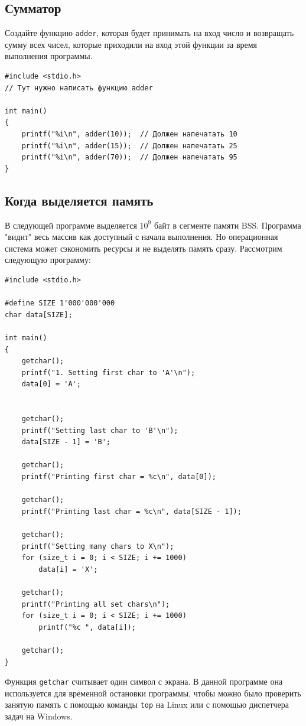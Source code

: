 \documentclass[10pt]{article}
\begin{document}
\subsection{Сумматор}
Создайте функцию \texttt{adder}, которая будет принимать на вход число и возвращать сумму всех чисел, которые приходили на вход этой функции за время выполнения программы.
\begin{lstlisting}
#include <stdio.h>
// Тут нужно написать функцию adder

int main()
{
    printf("%i\n", adder(10));  // Должен напечатать 10
    printf("%i\n", adder(15));  // Должен напечатать 25
    printf("%i\n", adder(70));  // Должен напечатать 95
}
\end{lstlisting}

\subsection{Когда выделяется память}
В следующей программе выделяется $10^9$ байт в сегменте памяти BSS. Программа "видит"{} весь массив как доступный с начала выполнения. Но операционная система может сэкономить ресурсы и не выделять память сразу. Рассмотрим следующую программу:
\begin{lstlisting}
#include <stdio.h>

#define SIZE 1'000'000'000
char data[SIZE];

int main()
{
    getchar();
    printf("1. Setting first char to 'A'\n");
    data[0] = 'A';
    
    
    getchar();
    printf("Setting last char to 'B'\n");
    data[SIZE - 1] = 'B';
    
    getchar();
    printf("Printing first char = %c\n", data[0]);
    
    getchar();
    printf("Printing last char = %c\n", data[SIZE - 1]);
    
    getchar();
    printf("Setting many chars to X\n");
    for (size_t i = 0; i < SIZE; i += 1000)
        data[i] = 'X';
        
    getchar();
    printf("Printing all set chars\n");
    for (size_t i = 0; i < SIZE; i += 1000)
        printf("%c ", data[i]);
        
    getchar();
}
\end{lstlisting}
Функция \texttt{getchar} считывает один символ с экрана. В данной программе она используется для временной остановки программы, чтобы можно было проверить занятую память с помощью команды \texttt{top} на Linux или с помощью диспетчера задач на Windows.
\end{document}
